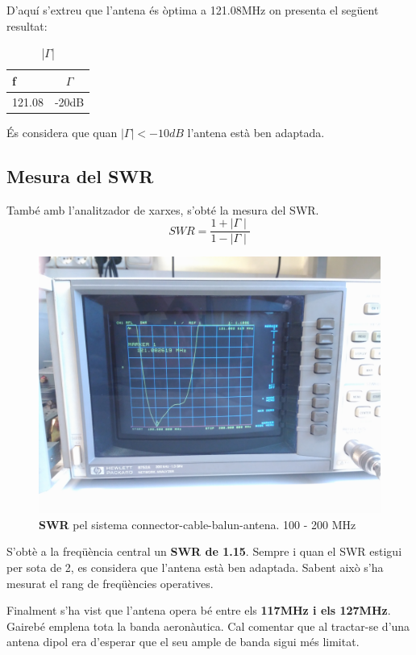 D'aquí s'extreu que l'antena és òptima a 121.08MHz on presenta el següent resultat:
\begin{table}[H]
	\centering
	\begin{tabular}{lc}
		\toprule[3pt]
		\textbf{f}&\textbf{$\Gamma$}\\
		\midrule[1pt]
		121.08 & -20dB \\
		\bottomrule[2pt]
	\end{tabular}
	\caption{|$\Gamma$|}
	\label{gamma}
\end{table}
És considera que quan $\mid\Gamma\mid < -10dB$ l'antena està ben adaptada.
\subsection{Mesura del SWR}
També amb l'analitzador de xarxes, s'obté la mesura del SWR.
\begin{equation}
SWR =\frac{1+\mid\Gamma\mid}{1-\mid\Gamma\mid}
\end{equation}
\begin{figure}[H]
	\centering
	\includegraphics[width=\textwidth]{./images/Mesures/3swr.jpg}
	\caption{\textbf{SWR} pel sistema connector-cable-balun-antena. 100 - 200 MHz}
	\label{swr}
\end{figure}
S'obtè a la freqüència central un \textbf{SWR de 1.15}. Sempre i quan el SWR estigui per sota de 2, es considera que l'antena està ben adaptada. Sabent això s'ha mesurat el rang de freqüències operatives. 

Finalment s'ha vist que l'antena opera bé entre els \textbf{117MHz i els 127MHz}. Gairebé emplena tota la banda aeronàutica. Cal comentar que al tractar-se d'una antena dipol era d'esperar que el seu ample de banda sigui més limitat.
